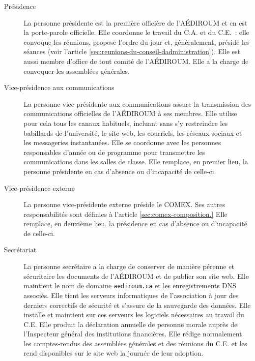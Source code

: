 \documentclass{aediroum}
\newcommand{\article}[1]{article \ref{#1}}
\begin{document}
\begin{description}
    \item[Présidence]
        La personne présidente est la première officière de l'AÉDIROUM et en est la porte-parole officielle.
        Elle coordonne le travail du C.A. et du C.E.~: elle convoque les réunions, propose l'ordre du jour et, généralement, préside les séances (voir l'\article{sec:reunions-du-conseil-dadministration}).
        Elle est aussi membre d'office de tout comité de l'AÉDIROUM.
        Elle a la charge de convoquer les assemblées générales.

    \item[Vice-présidence aux communications]
        La personne vice-présidente aux communications assure la transmission des communications officielles de l’AÉDIROUM à ses membres.
        Elle utilise pour cela tous les canaux habituels, incluant sans s’y restreindre les babillards de l’université, le site web, les courriels, les réseaux sociaux et les messageries instantanées.
        Elle se coordonne avec les personnes responsables d’année ou de programme pour transmettre les communications dans les salles de classe.
        Elle remplace, en premier lieu, la personne présidente en cas d’absence ou d’incapacité de celle-ci.

    \item[Vice-présidence externe]
        La personne vice-présidente externe préside le COMEX.
        Ses autres responsabilités sont définies à l'\article{sec:comex-composition.}
        Elle remplace, en deuxième lieu, la présidence en cas d’absence ou d’incapacité de celle-ci.

    \item[Secrétariat]
        La personne secrétaire a la charge de conserver de manière pérenne et sécuritaire les documents de l’AÉDIROUM et de publier son site web.
        Elle maintient le nom de domaine \texttt{aediroum.ca} et les enregistrements DNS associés.
        Elle tient les serveurs informatiques de l’association à jour des derniers correctifs de sécurité et s’assure de la sauvegarde des données.
        Elle installe et maintient sur ces serveurs les logiciels nécessaires au travail du C.E.
        Elle produit la déclaration annuelle de personne morale auprès de l’Inspecteur général des institutions financières.
        Elle rédige normalement les comptes-rendus des assemblées générales et des réunions du C.E. et les rend disponibles sur le site web la journée de leur adoption.


\end{description}
\end{document}
